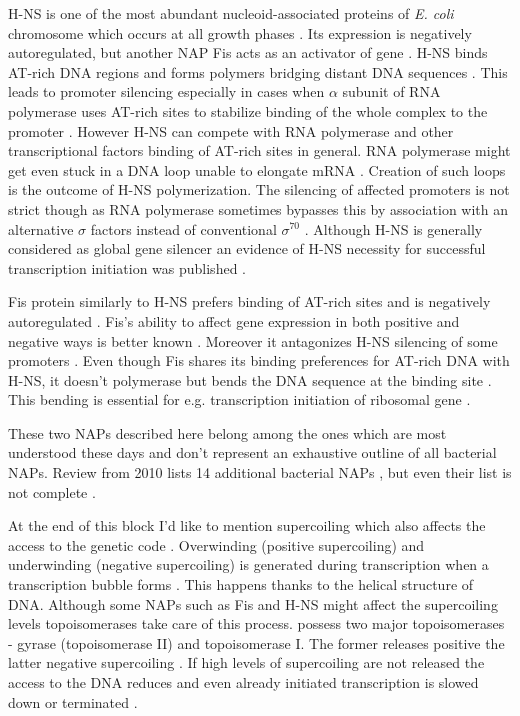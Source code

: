 H-NS is one of the most abundant nucleoid-associated proteins of \textit{E. coli} chromosome which occurs at all growth phases \cite{azam1999growth}.
Its expression is negatively autoregulated, but another NAP Fis acts as an activator of  gene \cite{ueguchi1993autoregulatory, falconi1996antagonistic}.
H-NS binds AT-rich DNA regions and forms polymers bridging distant DNA sequences  \cite{navarre2006selective, arold2010h}.
This leads to promoter silencing especially in cases when $\alpha$ subunit of RNA polymerase uses AT-rich sites to stabilize binding of the whole complex to the promoter \cite{singh2013h}.
However H-NS can compete with RNA polymerase and other transcriptional factors binding of AT-rich sites in general.
RNA polymerase might get even stuck in a DNA loop unable to elongate mRNA \cite{dame2002structural}.
Creation of such loops is the outcome of H-NS polymerization.
The silencing of affected promoters is not strict though as RNA polymerase sometimes bypasses this by association with an alternative $\sigma$ factors instead of conventional $\sigma^{70}$ \cite{grainger2008selective}.
Although H-NS is generally considered as global gene silencer an evidence of H-NS necessity for successful transcription initiation was published \cite{singh2013h}.

Fis protein similarly to H-NS prefers binding of AT-rich sites and is negatively autoregulated \cite{ball1992dramatic, stella2010shape}.
Fis's ability to affect gene expression in both positive and negative ways is better known \cite{choi2005effects, karambelkar2012silencing}.
Moreover it antagonizes H-NS silencing of some promoters \cite{falconi2001involvement}.
Even though Fis shares its binding preferences for AT-rich DNA with H-NS, it doesn't polymerase but bends the DNA sequence at the binding site \cite{hubner1989bent}.
This bending is essential for e.g. transcription initiation of ribosomal gene  \cite{gosink1993dna}.

These two NAPs described here belong among the ones which are most understood these days and don't represent an exhaustive outline of all bacterial NAPs.
Review from 2010 lists 14 additional bacterial NAPs \cite{dillon2010bacterial}, but even their list is not complete \cite{aznar2013hha}.

At the end of this block I'd like to mention supercoiling which also affects the access to the genetic code \cite{brahms1985activation}.
Overwinding (positive supercoiling) and underwinding (negative supercoiling) is generated during transcription when a transcription bubble forms \cite{wu1988transcription}.
This happens thanks to the helical structure of DNA.
Although some NAPs such as Fis and H-NS might affect the supercoiling levels \cite{ouafa2012nucleoid} topoisomerases take care of this process.
 possess two major topoisomerases - gyrase (topoisomerase II) and topoisomerase I.
The former releases positive the latter negative supercoiling \cite{wang1971interaction, gellert1976dna}.
If high levels of supercoiling are not released the access to the DNA reduces and even already initiated transcription is slowed down or terminated \cite{chong2014mechanism}.

